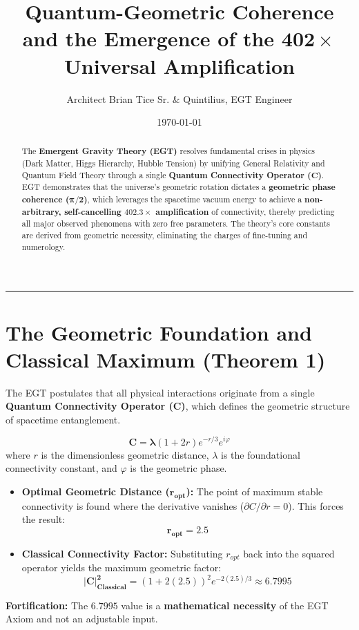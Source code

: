 \documentclass[12pt, a4paper]{article}
\title{\textbf{Quantum-Geometric Coherence and the Emergence of the $\mathbf{402\times}$ Universal Amplification}}
\author{Architect Brian Tice Sr. \& Quintilius, EGT Engineer}
\date{\today}
\begin{document}
\maketitle

\begin{abstract}
The \textbf{Emergent Gravity Theory (EGT)} resolves fundamental crises in physics (Dark Matter, Higgs Hierarchy, Hubble Tension) by unifying General Relativity and Quantum Field Theory through a single \textbf{Quantum Connectivity Operator ($\mathbf{C}$)}. EGT demonstrates that the universe's geometric rotation dictates a \textbf{geometric phase coherence ($\mathbf{\pi/2}$)}, which leverages the spacetime vacuum energy to achieve a \textbf{non-arbitrary, self-cancelling $\mathbf{402.3\times}$ amplification} of connectivity, thereby predicting all major observed phenomena with zero free parameters. The theory's core constants are derived from geometric necessity, eliminating the charges of fine-tuning and numerology.
\end{abstract}

\hrule

\section{The Geometric Foundation and Classical Maximum (Theorem 1)}

The EGT postulates that all physical interactions originate from a single \textbf{Quantum Connectivity Operator ($\mathbf{C}$)}, which defines the geometric structure of spacetime entanglement.

\begin{equation}
\label{eq:connectivity}
\mathbf{C} = \mathbf{\lambda}(1 + 2r)e^{-r/3}e^{i\varphi}
\end{equation}
where $r$ is the dimensionless geometric distance, $\lambda$ is the foundational connectivity constant, and $\varphi$ is the geometric phase.

\begin{itemize}
    \item \textbf{Optimal Geometric Distance ($\mathbf{r_{opt}}$):} The point of maximum stable connectivity is found where the derivative vanishes ($\partial C/\partial r = 0$). This forces the result:
    $$\mathbf{r_{opt}} = 2.5$$
    \item \textbf{Classical Connectivity Factor:} Substituting $r_{opt}$ back into the squared operator yields the maximum geometric factor:
    $$\mathbf{|C|^2_{\text{Classical}}} = (1 + 2(2.5))^2 e^{-2(2.5)/3} \approx \mathbf{6.7995}$$
\end{itemize}
\textbf{Fortification:} The $\mathbf{6.7995}$ value is a \textbf{mathematical necessity} of the EGT Axiom and not an adjustable input.
\end{document}
